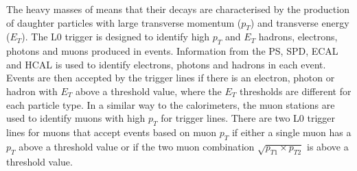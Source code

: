 


The heavy masses of \bhadrons means that their decays are characterised by the production of daughter particles with large transverse momentum ($p_{T}$) and transverse energy ($E_{T}$).
The L0 trigger is designed to identify high $p_{T}$ and $E_{T}$ hadrons, electrons, photons and muons produced in events. Information from the PS, SPD, ECAL and HCAL is used to identify electrons, photons and hadrons in each event. Events are then accepted by the trigger lines if there is an electron, photon or hadron with $E_{T}$ above a threshold value, where the $E_{T}$ thresholds are different for each particle type. %
In a similar way to the calorimeters, the muon stations are used to identify muons with high $p_{T}$ for trigger lines. There are two L0 trigger lines for muons that accept events based on muon $p_{T}$ if either a single muon has a $p_{T}$ above a threshold value or if the two muon combination $\sqrt{p_{T1} \times p_{T2}}$ is above a threshold value.

